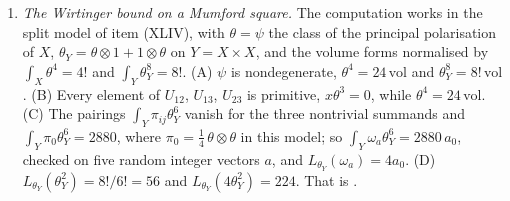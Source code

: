 \begin{enumerate}[label=\textup{(\Roman*)},leftmargin=*]
\item \emph{The Wirtinger bound on a Mumford square.} The computation works
  in the split model of item (XLIV), with $\theta=\psi$ the class of the
  principal polarisation of $X$, $\theta_{Y}=\theta\otimes1+1\otimes\theta$
  on $Y=X\times X$, and the volume forms normalised by $\int_{X}\theta^{4}=4!$
  and $\int_{Y}\theta_{Y}^{8}=8!$. (A) $\psi$ is nondegenerate,
  $\theta^{4}=24\,\mathrm{vol}$ and $\theta_{Y}^{8}=8!\,\mathrm{vol}$.
  (B) Every element of $U_{12}$, $U_{13}$, $U_{23}$ is primitive,
  $x\theta^{3}=0$, while $\theta^{4}=24\,\mathrm{vol}$. (C) The pairings
  $\int_{Y}\pi_{ij}\theta_{Y}^{6}$ vanish for the three nontrivial summands and
  $\int_{Y}\pi_{0}\theta_{Y}^{6}=2880$, where
  $\pi_{0}=\frac14\,\theta\otimes\theta$ in this model; so
  $\int_{Y}\omega_{a}\theta_{Y}^{6}=2880\,a_{0}$, checked on five random
  integer vectors $a$, and $L_{\theta_{Y}}(\omega_{a})=4a_{0}$. (D)
  $L_{\theta_{Y}}(\theta_{Y}^{2})=8!/6!=56$ and
  $L_{\theta_{Y}}(4\theta_{Y}^{2})=224$. That is .


\end{enumerate}
